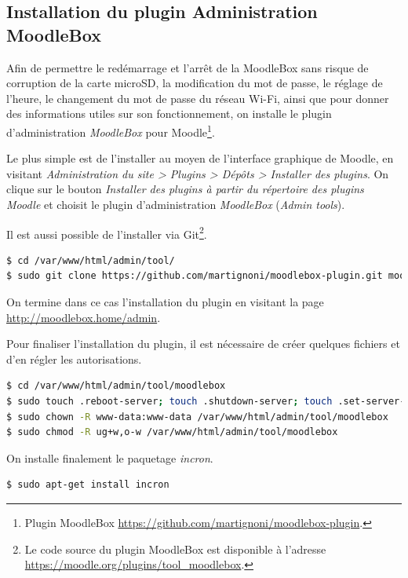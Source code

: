 \documentclass[11pt]{article}
\begin{document}
\subsection{Installation du plugin Administration MoodleBox}

Afin de permettre le redémarrage et l'arrêt de la MoodleBox sans risque de corruption de la carte microSD, la modification du mot de passe, le réglage de l'heure, le changement du mot de passe du réseau Wi-Fi, ainsi que pour donner des informations utiles sur son fonctionnement, on installe le plugin d'administration \emph{MoodleBox} pour Moodle\footnote{Plugin MoodleBox \url{https://github.com/martignoni/moodlebox-plugin}.}.

Le plus simple est de l'installer au moyen de l'interface graphique de Moodle, en visitant \emph{Administration du site > Plugins > Dépôts > Installer des plugins}. On clique sur le bouton \emph{Installer des plugins à partir du répertoire des plugins Moodle} et choisit le plugin d'administration \emph{MoodleBox} (\emph{Admin tools}).

Il est aussi possible de l'installer via Git\footnote{Le code source du plugin MoodleBox est disponible à l'adresse \url{https://moodle.org/plugins/tool_moodlebox}.}.

\begin{lstlisting}[language=bash]
$ cd /var/www/html/admin/tool/
$ sudo git clone https://github.com/martignoni/moodlebox-plugin.git moodlebox
\end{lstlisting}

On termine dans ce cas l'installation du plugin en visitant la page \url{http://moodlebox.home/admin}. 

Pour finaliser l'installation du plugin, il est nécessaire de créer quelques fichiers et d'en régler les autorisations.
\begin{lstlisting}[language=bash]
$ cd /var/www/html/admin/tool/moodlebox
$ sudo touch .reboot-server; touch .shutdown-server; touch .set-server-datetime; touch .newpassword; touch .wifipassword
$ sudo chown -R www-data:www-data /var/www/html/admin/tool/moodlebox
$ sudo chmod -R ug+w,o-w /var/www/html/admin/tool/moodlebox
\end{lstlisting}

On installe finalement le paquetage \emph{incron}.

\begin{lstlisting}[language=bash]
$ sudo apt-get install incron
\end{lstlisting}
\end{document}
